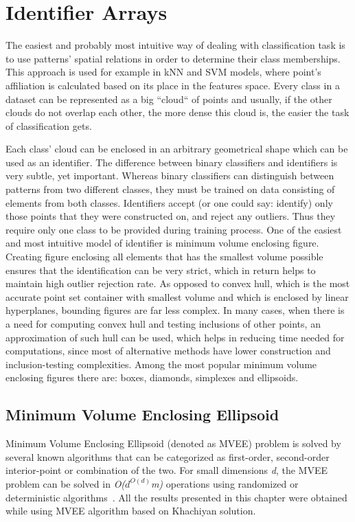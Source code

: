 \chapter{Identifier Arrays}

The easiest and probably most intuitive way of dealing with classification task is to use patterns' spatial relations in order to determine their class memberships. This approach is used for example in kNN and SVM models, where point's affiliation is calculated based on its place in the features space. Every class in a dataset can be represented as a big ``cloud`` of points and usually, if the other clouds do not overlap each other, the more dense this cloud is, the easier the task of classification gets.

Each class' cloud can be enclosed in an arbitrary geometrical shape which can be used as an identifier. The difference between binary classifiers and identifiers is very subtle, yet important. Whereas binary classifiers can distinguish between patterns from two different classes, they must be trained on data consisting of elements from both classes. Identifiers accept (or one could say: identify) only those points that they were constructed on, and reject any outliers. Thus they require only one class to be provided during training process. One of the easiest and most intuitive model of identifier is minimum volume enclosing figure. Creating figure enclosing all elements that has the smallest volume possible ensures that the identification can be very strict, which in return helps to maintain high outlier rejection rate. As opposed to convex hull, which is the most accurate point set container with smallest volume and which is enclosed by linear hyperplanes, bounding figures are far less complex. In many cases, when there is a need for computing convex hull and testing inclusions of other points, an approximation of such hull can be used, which helps in reducing time needed for computations, since most of alternative methods have lower construction and inclusion-testing complexities. Among the most popular minimum volume enclosing figures there are: boxes, diamonds, simplexes and ellipsoids.

\section{Minimum Volume Enclosing Ellipsoid}

Minimum Volume Enclosing Ellipsoid (denoted as MVEE) problem is solved by several known algorithms that can be categorized as first-order, second-order interior-point or combination of the two. For small dimensions \textit{d}, the MVEE problem can be solved in \textit{O($d^{O(d)}$m)} operations using randomized or deterministic algorithms~\cite{MVEEMichaelTodd2005}. All the results presented in this chapter were obtained while using MVEE algorithm based on Khachiyan solution.

